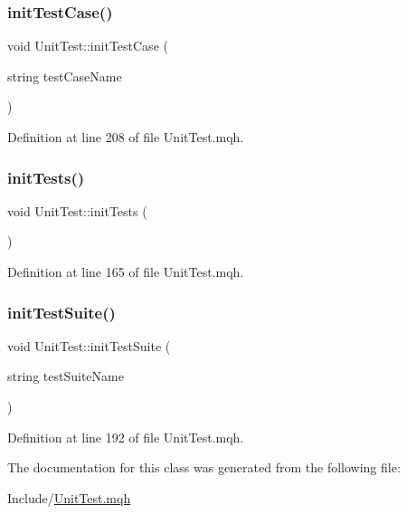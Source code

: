 \mbox{\label{class_unit_test_a36bf968fdd06f48ac17a0c29f6e46b41}} 
\subsubsection{\texorpdfstring{init\+Test\+Case()}{initTestCase()}}
{\footnotesize\ttfamily void Unit\+Test\+::init\+Test\+Case (\begin{DoxyParamCaption}\item[{string}]{test\+Case\+Name }\end{DoxyParamCaption})}



Definition at line 208 of file Unit\+Test.\+mqh.

\mbox{\label{class_unit_test_a92a41a1b2823a2e704838f756facbb25}} 
\subsubsection{\texorpdfstring{init\+Tests()}{initTests()}}
{\footnotesize\ttfamily void Unit\+Test\+::init\+Tests (\begin{DoxyParamCaption}{ }\end{DoxyParamCaption})}



Definition at line 165 of file Unit\+Test.\+mqh.

\mbox{\label{class_unit_test_a530ead4ec4c83464dd3ebdbbab9fd700}} 
\subsubsection{\texorpdfstring{init\+Test\+Suite()}{initTestSuite()}}
{\footnotesize\ttfamily void Unit\+Test\+::init\+Test\+Suite (\begin{DoxyParamCaption}\item[{string}]{test\+Suite\+Name }\end{DoxyParamCaption})}



Definition at line 192 of file Unit\+Test.\+mqh.



The documentation for this class was generated from the following file\+:\begin{DoxyCompactItemize}
\item 
Include/\mbox{\hyperlink{_unit_test_8mqh}{Unit\+Test.\+mqh}}\end{DoxyCompactItemize}
